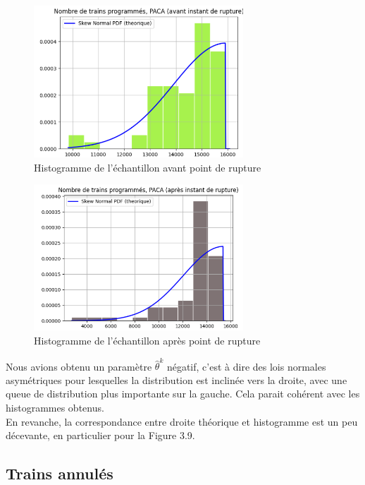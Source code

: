 {\begin{figure}[H]
  \centering
  \includegraphics[width=0.7\textwidth]{PACA_TP_4.png}
  \caption{Histogramme de l'échantillon avant point de rupture}
\end{figure}

\begin{figure}[H]
  \centering
  \includegraphics[width=0.7\textwidth]{PACA_TP_5.png}
  \caption{Histogramme de l'échantillon après point de rupture}
\end{figure}

Nous avions obtenu un paramètre $\hat{\theta}^k$ négatif, c'est à dire des lois normales asymétriques pour lesquelles la distribution est inclinée vers la droite, avec une queue de distribution plus importante sur la gauche. Cela parait cohérent avec les histogrammes obtenus.\\
En revanche, la correspondance entre droite théorique et histogramme est un peu décevante, en particulier pour la Figure 3.9.

\subsection{Trains annulés}

}
